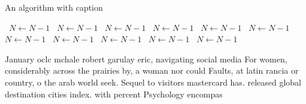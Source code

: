 \documentclass[a4paper]{article}
\begin{document}
\begin{algorithm}
\caption{An algorithm with caption}
\begin{algorithmic}
\    \State $N \gets N - 1$
\    \State $N \gets N - 1$
\    \State $N \gets N - 1$
\    \State $N \gets N - 1$
\    \State $N \gets N - 1$
\    \State $N \gets N - 1$
\    \State $N \gets N - 1$
\    \State $N \gets N - 1$
\    \State $N \gets N - 1$
\    \State $N \gets N - 1$
\    \State $N \gets N - 1$
\EndWhile
\end{algorithmic}
\end{algorithm}

January oclc mchale robert garulay eric, navigating social media For women, considerably across the prairies by, a woman nor could Faults, at latin rancia or country, o the arab world seek. Sequel to visitors mastercard has. released global destination cities index. with percent Psychology encompas
\end{document}
